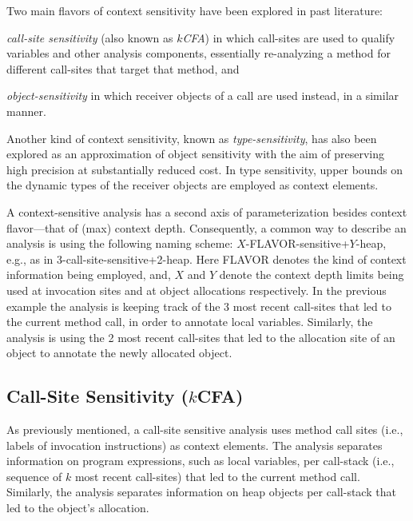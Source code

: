 Two main flavors of context sensitivity have been explored in past literature:
\begin{inparaenum}[(1)]
\item \emph{call-site sensitivity} (also known as \emph{$k$CFA}) \cite{col:1981:Sharir,thesis:Shivers} in which call-sites are used to qualify variables and other analysis components, essentially re-analyzing a method for different call-sites that target that method, and
\item \emph{object-sensitivity} \cite{issta:2002:Milanova,article:2005:Milanova,popl:2011:Smaragdakis} in which receiver objects of a call are used instead, in a similar manner.
\end{inparaenum}
Another kind of context sensitivity, known as \emph{type-sensitivity}, has also been explored as an approximation of object sensitivity with the aim of preserving high precision at substantially reduced cost. In type sensitivity, upper bounds on the dynamic types of the receiver objects are employed as context elements.

A context-sensitive analysis has a second axis of parameterization besides context flavor---that of (max) context depth. Consequently, a common way to describe an analysis is using the following naming scheme: $X$-FLAVOR-sensitive+$Y$-heap, e.g., as in 3-call-site-sensitive+2-heap. Here FLAVOR denotes the kind of context information being employed, and, $X$ and $Y$ denote the context depth limits being used at invocation sites and at object allocations respectively. In the previous example the analysis is keeping track of the 3 most recent call-sites that led to the current method call, in order to annotate local variables. Similarly, the analysis is using the 2 most recent call-sites that led to the allocation site of an object to annotate the newly allocated object.


\subsection{Call-Site Sensitivity (\texorpdfstring{$k$}{k}CFA)}

As previously mentioned, a call-site sensitive analysis uses method call sites (i.e., labels of invocation instructions) as context elements. The analysis separates information on program expressions, such as local variables, per call-stack (i.e., sequence of $k$ most recent call-sites) that led to the current method call. Similarly, the analysis separates information on heap objects per call-stack that led to the object's allocation.

